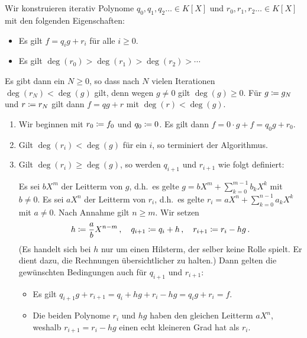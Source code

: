 \section{}

Wir konstruieren iterativ Polynome $q_0, q_1, q_2 \dotsc \in K[X]$ und $r_0, r_1, r_2 \dotsc \in K[X]$ mit den folgenden Eigenschaften:
\begin{itemize}
  \item
    Es gilt $f = q_i g + r_i$ für alle $i \geq 0$.
  \item
    Es gilt $\deg(r_0) > \deg(r_1) > \deg(r_2) > \dotsb$
\end{itemize}
Es gibt dann ein $N \geq 0$, so dass nach $N$ vielen Iterationen $\deg(r_N) < \deg(g)$ gilt, denn wegen $g \neq 0$ gilt $\deg(g) \geq 0$.
Für $g \coloneqq g_N$ und $r \coloneqq r_N$ gilt dann $f = qg + r$ mit $\deg(r) < \deg(g)$.

\begin{enumerate}
  \item
    Wir beginnen mit $r_0 \coloneqq f_0$ und $q_0 \coloneqq 0$.
    Es gilt dann $f = 0 \cdot g + f = q_0 g + r_0$.
  \item
    Gilt $\deg(r_i) < \deg(g)$ für ein $i$, so terminiert der Algorithmus.
  \item
    Gilt $\deg(r_i) \geq \deg(g)$, so werden $q_{i+1}$ und $r_{i+1}$ wie folgt definiert:
    
    Es sei $b X^m$ der Leitterm von $g$, d.h.\ es gelte $g = b X^m + \sum_{k=0}^{m-1} b_k X^k$ mit $b \neq 0$.
    Es sei $a X^n$ der Leitterm von $r_i$, d.h.\ es gelte $r_i = a X^n + \sum_{k=0}^{n-1} a_k X^k$ mit $a \neq 0$.
    Nach Annahme gilt $n \geq m$.
    Wir setzen
    \begin{align*}
      h       \coloneqq \frac{a}{b} X^{n-m} \,,
      \quad
      q_{i+1} \coloneqq q_i + h \,,
      \quad
      r_{i+1} \coloneqq r_i - h g \,.
    \end{align*}
    (Es handelt sich bei $h$ nur um einen Hilsterm, der selber keine Rolle spielt.
    Er dient dazu, die Rechnungen übersichtlicher zu halten.)
    Dann gelten die gewünschten Bedingungen auch für $q_{i+1}$ und $r_{i+1}$:
    \begin{itemize}
      \item
        Es gilt $q_{i+1} g + r_{i+1} = q_i + h g + r_i - h g = q_i g + r_i = f$.
      \item
        Die beiden Polynome $r_i$ und $h g$ haben den gleichen Leitterm $a X^n$, weshalb $r_{i+1} = r_i - h g$ einen echt kleineren Grad hat als $r_i$.
    \end{itemize}
\end{enumerate}


